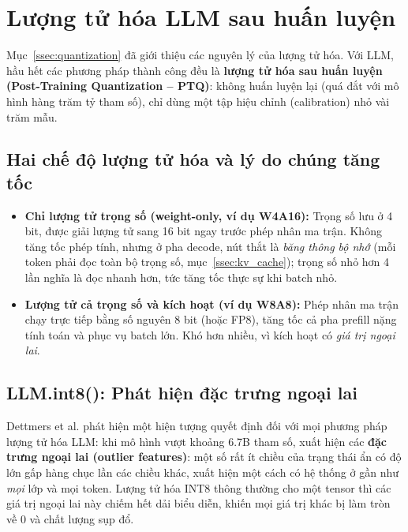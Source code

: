 
\section{Lượng tử hóa LLM sau huấn luyện}
\label{sec:llm_quantization}

Mục~\ref{ssec:quantization} đã giới thiệu các nguyên lý của lượng tử hóa. Với LLM, hầu hết các phương pháp thành công đều là \textbf{lượng tử hóa sau huấn luyện (Post-Training Quantization -- PTQ)}: không huấn luyện lại (quá đắt với mô hình hàng trăm tỷ tham số), chỉ dùng một tập hiệu chỉnh (calibration) nhỏ vài trăm mẫu.

\subsection{Hai chế độ lượng tử hóa và lý do chúng tăng tốc}
\label{ssec:quant_regimes}
\begin{itemize}
	\item \textbf{Chỉ lượng tử trọng số (weight-only, ví dụ W4A16):} Trọng số lưu ở 4 bit, được giải lượng tử sang 16 bit ngay trước phép nhân ma trận. Không tăng tốc phép tính, nhưng ở pha decode, nút thắt là \emph{băng thông bộ nhớ} (mỗi token phải đọc toàn bộ trọng số, mục~\ref{ssec:kv_cache}); trọng số nhỏ hơn 4 lần nghĩa là đọc nhanh hơn, tức tăng tốc thực sự khi batch nhỏ.
	\item \textbf{Lượng tử cả trọng số và kích hoạt (ví dụ W8A8):} Phép nhân ma trận chạy trực tiếp bằng số nguyên 8 bit (hoặc FP8), tăng tốc cả pha prefill nặng tính toán và phục vụ batch lớn. Khó hơn nhiều, vì kích hoạt có \emph{giá trị ngoại lai}.
\end{itemize}

\subsection{LLM.int8(): Phát hiện đặc trưng ngoại lai}
\label{ssec:llm_int8}
Dettmers et al. \cite{dettmers2022llmint8} phát hiện một hiện tượng quyết định đối với mọi phương pháp lượng tử hóa LLM: khi mô hình vượt khoảng 6.7B tham số, xuất hiện các \textbf{đặc trưng ngoại lai (outlier features)}: một số rất ít chiều của trạng thái ẩn có độ lớn gấp hàng chục lần các chiều khác, xuất hiện một cách có hệ thống ở gần như \emph{mọi} lớp và mọi token. Lượng tử hóa INT8 thông thường cho một tensor thì các giá trị ngoại lai này chiếm hết dải biểu diễn, khiến mọi giá trị khác bị làm tròn về 0 và chất lượng sụp đổ.

